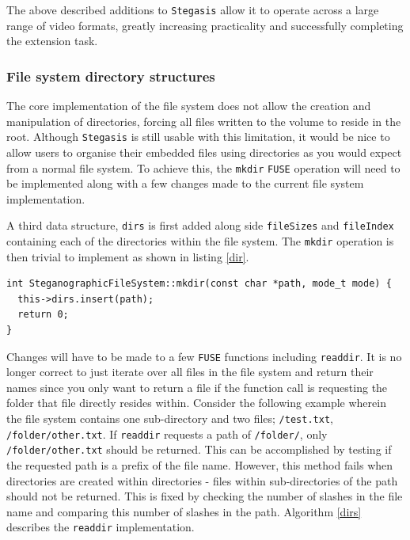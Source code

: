 \documentclass[paper=a4, fontsize=11pt,twoside]{scrartcl}
\numberwithin{table}{section}
\numberwithin{figure}{section}
\numberwithin{algorithm}{section}
\begin{document}
\noindent
The above described additions to \texttt{Stegasis} allow it to operate across a large range of video formats, greatly increasing practicality and successfully completing the extension task.

\subsubsection{File system directory structures}

The core implementation of the file system does not allow the creation and manipulation of directories, forcing all files written to the volume to reside in the root. Although \texttt{Stegasis} is still usable with this limitation, it would be nice to allow users to organise their embedded files using directories as you would expect from a normal file system. To achieve this, the \texttt{mkdir} \texttt{FUSE} operation will need to be implemented along with a few changes made to the current file system implementation.

A third data structure, \texttt{dirs} is first added along side \texttt{fileSizes} and \texttt{fileIndex} containing each of the directories within the file system. The \texttt{mkdir} operation is then trivial to implement as shown in listing \ref{dir}.

\begin{lstlisting}[caption={\texttt{FUSE} mkdir implementation (\texttt{fs/stegfs.cc:158}).}, frame=single, label=dir]
int SteganographicFileSystem::mkdir(const char *path, mode_t mode) {
  this->dirs.insert(path);
  return 0;
}
\end{lstlisting}

Changes will have to be made to a few \texttt{FUSE} functions including \texttt{readdir}. It is no longer correct to just iterate over all files in the file system and return their names since you only want to return a file if the function call is requesting the folder that file directly resides within. Consider the following example wherein the file system contains one sub-directory and two files; \texttt{/test.txt}, \texttt{/folder/other.txt}. If \texttt{readdir} requests a path of \texttt{/folder/}, only \texttt{/folder/other.txt} should be returned. This can be accomplished by testing if the requested path is a prefix of the file name. However, this method fails when directories are created within directories - files within sub-directories of the path should not be returned. This is fixed by checking the number of slashes in the file name and comparing this number of slashes in the path. Algorithm \ref{dirs} describes the \texttt{readdir} implementation.
\end{document}
